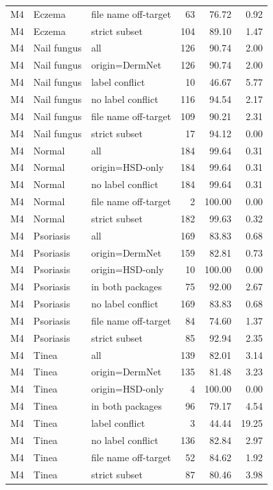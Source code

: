 \begin{tabular}{lllrrr}
M4 & Eczema & file name off-target & 63 & 76.72 & 0.92 \\
M4 & Eczema & strict subset & 104 & 89.10 & 1.47 \\
M4 & Nail fungus & all & 126 & 90.74 & 2.00 \\
M4 & Nail fungus & origin=DermNet & 126 & 90.74 & 2.00 \\
M4 & Nail fungus & label conflict & 10 & 46.67 & 5.77 \\
M4 & Nail fungus & no label conflict & 116 & 94.54 & 2.17 \\
M4 & Nail fungus & file name off-target & 109 & 90.21 & 2.31 \\
M4 & Nail fungus & strict subset & 17 & 94.12 & 0.00 \\
M4 & Normal & all & 184 & 99.64 & 0.31 \\
M4 & Normal & origin=HSD-only & 184 & 99.64 & 0.31 \\
M4 & Normal & no label conflict & 184 & 99.64 & 0.31 \\
M4 & Normal & file name off-target & 2 & 100.00 & 0.00 \\
M4 & Normal & strict subset & 182 & 99.63 & 0.32 \\
M4 & Psoriasis & all & 169 & 83.83 & 0.68 \\
M4 & Psoriasis & origin=DermNet & 159 & 82.81 & 0.73 \\
M4 & Psoriasis & origin=HSD-only & 10 & 100.00 & 0.00 \\
M4 & Psoriasis & in both packages & 75 & 92.00 & 2.67 \\
M4 & Psoriasis & no label conflict & 169 & 83.83 & 0.68 \\
M4 & Psoriasis & file name off-target & 84 & 74.60 & 1.37 \\
M4 & Psoriasis & strict subset & 85 & 92.94 & 2.35 \\
M4 & Tinea & all & 139 & 82.01 & 3.14 \\
M4 & Tinea & origin=DermNet & 135 & 81.48 & 3.23 \\
M4 & Tinea & origin=HSD-only & 4 & 100.00 & 0.00 \\
M4 & Tinea & in both packages & 96 & 79.17 & 4.54 \\
M4 & Tinea & label conflict & 3 & 44.44 & 19.25 \\
M4 & Tinea & no label conflict & 136 & 82.84 & 2.97 \\
M4 & Tinea & file name off-target & 52 & 84.62 & 1.92 \\
M4 & Tinea & strict subset & 87 & 80.46 & 3.98 \\

\end{tabular}
